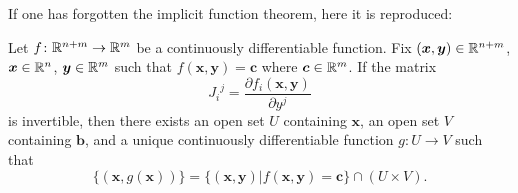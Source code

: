If one has forgotten the implicit function theorem, here it is reproduced:
\begin{implicitFunctionThm}
Let $f\colon\Bbb{R}^{n+m}\to\Bbb{R}^{m}$ be a continuously
differentiable function. Fix
$(\boldsymbol{x},\boldsymbol{y})\in\Bbb{R}^{n+m}$,
$\boldsymbol{x}\in\Bbb{R}^{n}$,
$\boldsymbol{y}\in\Bbb{R}^{m}$ such that
$f(\boldsymbol{x},\boldsymbol{y})=\boldsymbol{c}$ where $\boldsymbol{c}\in\Bbb{R}^{m}$. If the matrix
\begin{equation}
{J_{i}}^{j}=\frac{\partial f_{i}(\boldsymbol{x},\boldsymbol{y})}{\partial y^{j}}
\end{equation}
is invertible, then there exists an open set $U$ containing
$\boldsymbol{x}$, an open set $V$ containing $\boldsymbol{b}$,
and a unique continuously differentiable function $g\colon U\to
V$ such that
\begin{equation}
\{ (\boldsymbol{x}, g(\boldsymbol{x})) \} = \{ (\boldsymbol{x}, \boldsymbol{y}) | f(\boldsymbol{x}, \boldsymbol{y}) = \boldsymbol{c} \} \cap (U \times V).
\end{equation}
\end{implicitFunctionThm}
